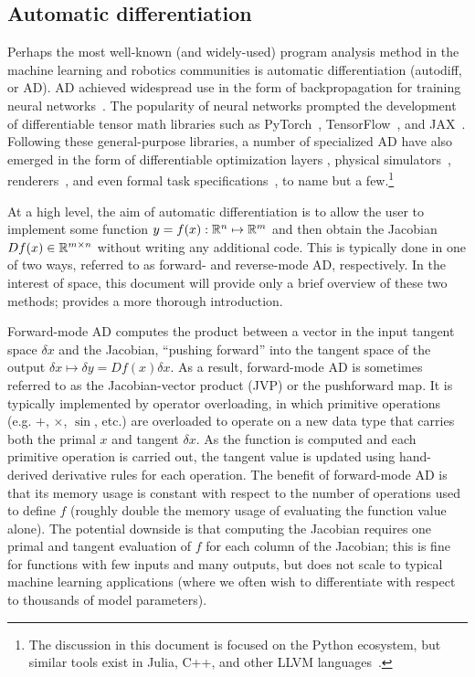 \subsection{Automatic differentiation}

Perhaps the most well-known (and widely-used) program analysis method in the machine learning and robotics communities is automatic differentiation (autodiff, or AD). AD achieved widespread use in the form of backpropagation for training neural networks~\cite{rumelhartLearningRepresentationsBackpropagating1986}. The popularity of neural networks prompted the development of differentiable tensor math libraries such as PyTorch~\cite{pytorch}, TensorFlow~\cite{tensorflow2015-whitepaper}, and JAX~\cite{jax2018github}. Following these general-purpose libraries, a number of specialized AD have also emerged in the form of differentiable optimization layers \cite{agrawalDifferentiableConvexOptimization2019}, physical simulators~\cite{huDiffTaichiDifferentiableProgramming2019}, renderers~\cite{huDiffTaichiDifferentiableProgramming2019,lelidecDifferentiableRenderingPerturbed2021}, and even formal task specifications~\cite{leungBackPropagationSignalTemporal2021}, to name but a few.\footnote{The discussion in this document is focused on the Python ecosystem, but similar tools exist in Julia, C++, and other LLVM languages~\cite{NEURIPS2020_9332c513}.}

At a high level, the aim of automatic differentiation is to allow the user to implement some function $y = f(x): \mathbb{R}^n \mapsto \mathbb{R}^m$ and then obtain the Jacobian $Df(x) \in \mathbb{R}^{m\times n}$ without writing any additional code. This is typically done in one of two ways, referred to as forward- and reverse-mode AD, respectively. In the interest of space, this document will provide only a brief overview of these two methods; \cite{AutodiffCookbookJAX} provides a more thorough introduction.

Forward-mode AD computes the product between a vector in the input tangent space $\delta x$ and the Jacobian, ``pushing forward'' into the tangent space of the output $\delta x \mapsto \delta y = Df(x) \delta x$. As a result, forward-mode AD is sometimes referred to as the Jacobian-vector product (JVP) or the pushforward map. It is typically implemented by operator overloading, in which primitive operations (e.g. $+$, $\times$, $\sin$, etc.) are overloaded to operate on a new data type that carries both the primal $x$ and tangent $\delta x$. As the function is computed and each primitive operation is carried out, the tangent value is updated using hand-derived derivative rules for each operation. The benefit of forward-mode AD is that its memory usage is constant with respect to the number of operations used to define $f$ (roughly double the memory usage of evaluating the function value alone). The potential downside is that computing the Jacobian requires one primal and tangent evaluation of $f$ for each column of the Jacobian; this is fine for functions with few inputs and many outputs, but does not scale to typical machine learning applications (where we often wish to differentiate with respect to thousands of model parameters).

